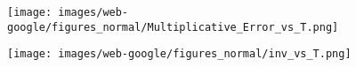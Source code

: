 \begin{figure*}[htbp]
\begin{subfigure}[b]{\textwidth}
\begin{minipage}[b]{0.3\textwidth}
\end{minipage}%
\begin{minipage}[b]{0.3\textwidth}
	\centering
	
	\texttt{[image: images/web-google/figures\_normal/Multiplicative\_Error\_vs\_T.png]} %
	
\end{minipage}%
\begin{minipage}[b]{0.3\textwidth}
	\centering
	
	\texttt{[image: images/web-google/figures\_normal/inv\_vs\_T.png]} %
\end{minipage}
\end{subfigure}
\end{figure*}

